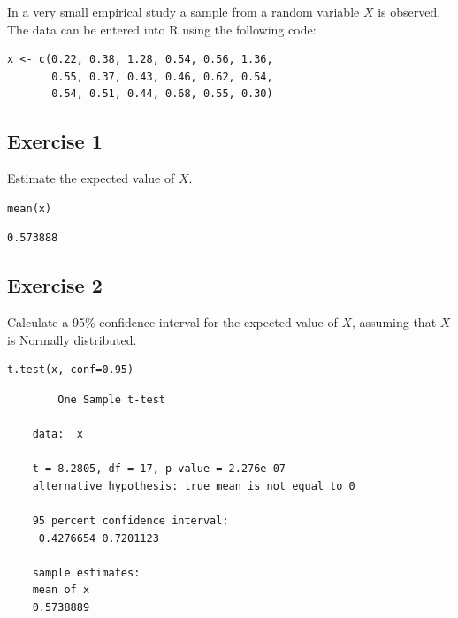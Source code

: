 \documentclass[a4paper,12pt]{article}
\begin{document}
\Large 

\noindent In a very small empirical study a sample from a random variable $X$ is observed. 
The data can be entered into R using the following code:


\begin{framed}\begin{verbatim}
x <- c(0.22, 0.38, 1.28, 0.54, 0.56, 1.36,
       0.55, 0.37, 0.43, 0.46, 0.62, 0.54,
       0.54, 0.51, 0.44, 0.68, 0.55, 0.30)
\end{verbatim} \end{framed}

\medskip 
\subsection*{Exercise 1} 
\noindent Estimate the expected value of $X$.


\begin{framed}\begin{verbatim}
mean(x)
\end{verbatim} \end{framed}

\begin{verbatim}
0.573888
\end{verbatim}


\newpage
\subsection*{Exercise 2} 
\noindent Calculate a 95\% confidence interval for the expected value of $X$, assuming that $X$ is Normally distributed.

\begin{framed}\begin{verbatim}
t.test(x, conf=0.95)
\end{verbatim} \end{framed}
\begin{verbatim}
    	One Sample t-test
    
    data:  x
    
    t = 8.2805, df = 17, p-value = 2.276e-07
    alternative hypothesis: true mean is not equal to 0
    
    95 percent confidence interval:
     0.4276654 0.7201123
    
    sample estimates:
    mean of x 
    0.5738889 
    
\end{verbatim}
\newpage 
\end{document}
